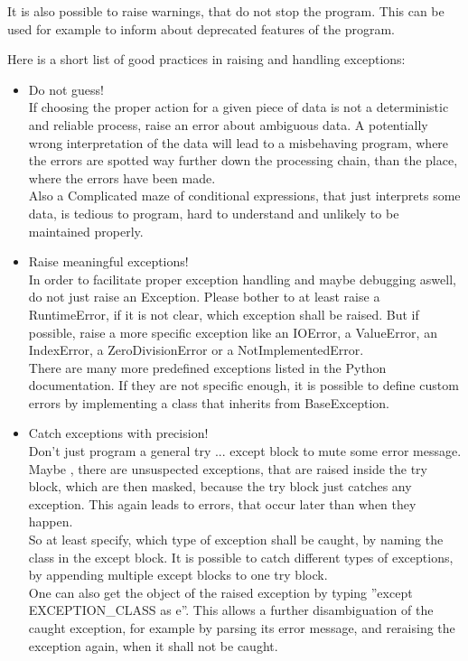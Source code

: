 		It is also possible to raise warnings, that do not stop the program.
		This can be used for example to inform about deprecated features of the program.

		Here is a short list of good practices in raising and handling exceptions:
		\begin{itemize}
			\item Do not guess!\\
			      If choosing the proper action for a given piece of data is not a deterministic and reliable process, raise an error about ambiguous data.
			      A potentially wrong interpretation of the data will lead to a misbehaving program, where the errors are spotted way further down the processing chain, than the place, where the errors have been made.\\
			      Also a Complicated maze of conditional expressions, that just interprets some data, is tedious to program, hard to understand and unlikely to be maintained properly.
			\item Raise meaningful exceptions!\\
			      In order to facilitate proper exception handling and maybe debugging aswell, do not just raise an {\normalfont \ttfamily Exception}.
			      Please bother to at least raise a {\normalfont \ttfamily RuntimeError}, if it is not clear, which exception shall be raised.
			      But if possible, raise a more specific exception like an {\normalfont \ttfamily IOError}, a {\normalfont \ttfamily ValueError}, an {\normalfont \ttfamily IndexError}, a {\normalfont \ttfamily ZeroDivisionError} or a {\normalfont \ttfamily NotImplementedError}.\\
			      There are many more predefined exceptions listed in the Python documentation.
			      If they are not specific enough, it is possible to define custom errors by implementing a class that inherits from {\normalfont \ttfamily BaseException}.
			\item Catch exceptions with precision!\\
			      Don't just program a general {\normalfont \ttfamily try ... except} block to mute some error message.
			      Maybe , there are unsuspected exceptions, that are raised inside the {\normalfont \ttfamily try} block, which are then masked, because the {\normalfont \ttfamily try} block just catches any exception.
			      This again leads to errors, that occur later than when they happen.\\
			      So at least specify, which type of exception shall be caught, by naming the class in the {\normalfont \ttfamily except} block.
			      It is possible to catch different types of exceptions, by appending multiple {\normalfont \ttfamily except} blocks to one {\normalfont \ttfamily try} block.\\
			      One can also get the object of the raised exception by typing ''{\normalfont \ttfamily except EXCEPTION\_CLASS as e}''.
			      This allows a further disambiguation of the caught exception, for example by parsing its error message, and reraising the exception again, when it shall not be caught.
		\end{itemize}


